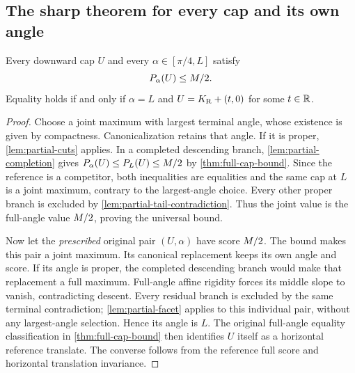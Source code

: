 \subsection{The sharp theorem for every cap and its own angle}

\begin{theorem}\label{thm:cap-bound}\label{thm:cap-equality}
Every downward cap $U$ and every $\alpha\in[\pi/4,L]$ satisfy
\[
 P_\alpha(U)\le M/2.
\]
Equality holds if and only if $\alpha=L$ and
$U=K_{\mathrm R}+(t,0)$ for some $t\in\mathbb{R}$.
\end{theorem}
\begin{proof}
Choose a joint maximum with largest terminal angle, whose existence
is given by compactness. Canonicalization retains that angle.
If it is proper, \cref{lem:partial-cuts} applies. In a completed
descending branch, \cref{lem:partial-completion} gives
$P_\alpha(U)\le P_L(U)\le M/2$ by
\cref{thm:full-cap-bound}. Since the reference is a competitor,
both inequalities are equalities and the same cap at $L$ is a
joint maximum, contrary to the largest-angle choice. Every other
proper branch is excluded by \cref{lem:partial-tail-contradiction}.
Thus the joint value is the full-angle value $M/2$, proving
the universal bound.

Now let the \emph{prescribed} original pair $(U,\alpha)$ have score
$M/2$. The bound makes this pair a joint maximum.
Its canonical replacement keeps its own angle and score.
If its angle is proper, the completed descending branch would make
that replacement a full maximum. Full-angle affine rigidity forces
its middle slope to vanish, contradicting descent.
Every residual branch is excluded by the same terminal contradiction;
\cref{lem:partial-facet} applies to this individual pair, without
any largest-angle selection. Hence its angle is $L$.
The original full-angle equality classification in
\cref{thm:full-cap-bound} then identifies $U$ itself as a
horizontal reference translate. The converse follows from the
reference full score and horizontal translation invariance.
\end{proof}
